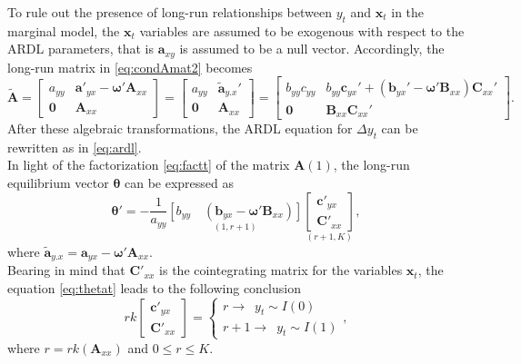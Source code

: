 To rule out the presence of long-run relationships between $y_{t}$ and $\mathbf{x}_{t}$ in the marginal model, 
the $\mathbf{x}_{t}$ variables are assumed to be exogenous with respect to the ARDL parameters, that is $\mathbf{a}_{xy}$ is assumed to be a null vector.
Accordingly, the long-run matrix in \eqref{eq:condAmat2} becomes
\begin{equation}\label{eq:cond}
\widetilde{\mathbf{A}}=\begin{bmatrix}a_{yy} & \mathbf{a}'_{yx}-\boldsymbol{\omega}'\mathbf{A}_{xx} \\ \mathbf{0} & \mathbf{A}_{xx} 
\end{bmatrix}=\begin{bmatrix}
a_{yy} & \widetilde{\mathbf{a}}_{y.x}' \\ \mathbf{0}&\mathbf{A}_{xx}\end{bmatrix} =\begin{bmatrix}
b_{yy}c_{yy} & b_{yy}\mathbf c_{yx}'+(\mathbf{b}_{yx}'-\boldsymbol{\omega}'\mathbf{B}_{xx})\mathbf{C}_{xx}' \\ \mathbf{0}& \mathbf{B}_{xx}\mathbf{C}_{xx}'\end{bmatrix}.
\end{equation}
After these algebraic transformations, the ARDL equation for $\Delta y_{t}$ can be rewritten as in \eqref{eq:ardl}.\\
In light of the factorization \eqref{eq:factt}
of the matrix $\mathbf{A}(1)$, the long-run equilibrium vector $\boldsymbol{\theta}$ can be expressed as
\begin{equation}\label{eq:thetat}
\boldsymbol{\theta}'=
-\frac{1}{a_{yy}}\underset{(1,r+1)}{\left[b_{yy}\enspace\enspace(\mathbf{b}_{yx}-\boldsymbol{\omega}'\mathbf{B}_{xx})\right]}
\underset{(r+1,K)}{\begin{bmatrix} \mathbf{c}'_{yx}\\ \mathbf{C}'_{xx} \end{bmatrix}},
\end{equation}
where $\widetilde{\mathbf{a}}_{y.x}=\mathbf{a}_{yx}-\boldsymbol{\omega}'\mathbf{A}_{xx}$.\\
Bearing in mind that $\mathbf{C}'_{xx}$ is the cointegrating matrix for the variables $\mathbf{x}_t$, the equation \eqref{eq:thetat} leads to the following conclusion
\begin{equation}\label{eq:rank}
rk\begin{bmatrix}\mathbf{c}'_{yx}\\ \mathbf{C}'_{xx}\end{bmatrix}=\begin{cases}
r  \to \enspace y_{t} \sim I(0) \\
r+1 \to \enspace y_{t} \sim I(1) 
\end{cases},
\end{equation}
where $r=rk(\mathbf{A}_{xx})$ and $0 \leq r\leq K$.  \\

